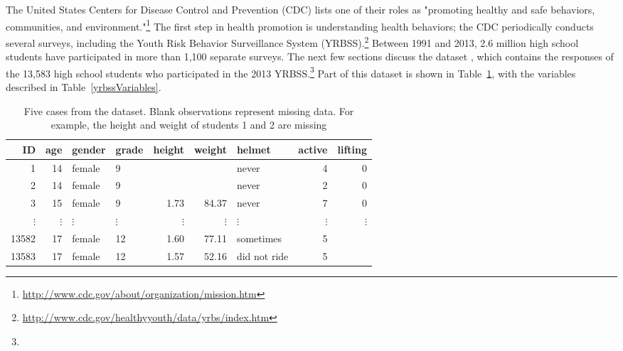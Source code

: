 \begin{spacing}{1.5}
The United States Centers for Disease Control and Prevention (CDC) lists one of their roles as "promoting healthy and safe behaviors, communities, and environment."\footnote{\url{http://www.cdc.gov/about/organization/mission.htm}} The first step in health promotion is understanding health behaviors; the CDC periodically conducts several surveys, including the Youth Risk Behavior Surveillance System (YRBSS).\footnote{\url{http://www.cdc.gov/healthyyouth/data/yrbs/index.htm}} Between 1991 and 2013, 2.6 million high school students have participated in more than 1,100 separate surveys. The next few sections discuss the dataset , which contains the responses of the 13,583 high school students who participated in the 2013 YRBSS.\footnote{} Part of this dataset is shown in Table~\ref{yrbssDF}, with the variables described in Table~\ref{yrbssVariables}.

\begin{table}[h]
\centering
\begin{tabular}{rrllrrlrr}
  \hline
ID & age & gender & grade & height & weight & helmet & active & lifting \\ 
  \hline
1 &  14 & female & 9 &  &  & never &   4 &   0 \\ 
  2 &  14 & female & 9 &  &  & never &   2 &   0 \\ 
  3 &  15 & female & 9 & 1.73 & 84.37 & never &   7 &   0 \\ 
  $\vdots$ & $\vdots$ & $\vdots$ & $\vdots$ & $\vdots$ & $\vdots$ & $\vdots$ & $\vdots$ & $\vdots$ \\
  13582 &  17 & female & 12 & 1.60 & 77.11 & sometimes &   5 &  \\ 
  13583 &  17 & female & 12 & 1.57 & 52.16 & did not ride &   5 &  \\ 
  \hline
\end{tabular}
\caption{Five cases from the  dataset. Blank observations represent missing data. For example, the height and weight of students 1 and 2 are missing\textC{\vspace{-2mm}}}
\label{yrbssDF}
\end{table}


\end{spacing}
